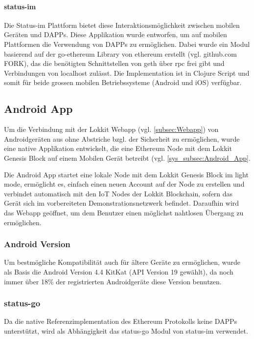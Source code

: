 \paragraph{status-im}
Die Status-im Plattform bietet diese Interaktionsmöglichkeit zwischen mobilen Geräten und \acrshort{DAPPs}. Diese Applikation wurde entworfen, um auf mobilen Plattformen die Verwendung von \acrshort{DAPPs} zu ermöglichen. Dabei wurde ein Modul basierend auf der go-ethereum Library von ethereum erstellt (vgl. github.com FORK), das die benötigten Schnittstellen von geth über rpc frei gibt und Verbindungen von localhost zulässt. Die Implementation ist in Clojure Script und somit für beide grossen mobilen Betriebssysteme (Android und iOS) verfügbar.\cite{status-im_whitepaper, github.com/status-im/status-go}

\subsection{Android App}
\label{subsec:Android_App}
Um die Verbindung mit der Lokkit Webapp (vgl. \ref{subsec:Webapp}) von Androidgeräten aus ohne Abstriche bzgl. der Sicherheit zu ermöglichen, wurde eine native Applikation entwickelt, die eine Ethereum Node mit dem Lokkit Genesis Block auf einem Mobilen Gerät betreibt (vgl. \ref{sys_subsec:Android_App}.

Die Android App startet eine lokale Node mit dem Lokkit Genesis Block im light mode, ermöglicht es, einfach einen neuen Account auf der Node zu erstellen und verbindet automatisch mit den IoT Nodes der Lokkit Blockchain, sofern das Gerät sich im vorbereiteten Demonstrationsnetzwerk befindet. Daraufhin wird das Webapp geöffnet, um dem Benutzer einen möglichst nahtlosen Übergang zu ermöglichen.
\subsubsection{Android Version}
Um bestmögliche Kompatibilität auch für ältere Geräte zu ermöglichen, wurde als Basis die Android Version 4.4 KitKat (API Version 19 gewählt), da noch immer über 18\% der registrierten Androidgeräte diese Version benutzen.\cite[Android/Dashboards]{developer.android.com}
\subsubsection{status-go}
Da die native Referenzimplementation des Ethereum Protokolls keine \acrshort{DAPPs} unterstützt, wird als Abhängigkeit das status-go Modul von status-im verwendet.\cite{go-ethereum,status.im,github.com/status-im/status-go}


